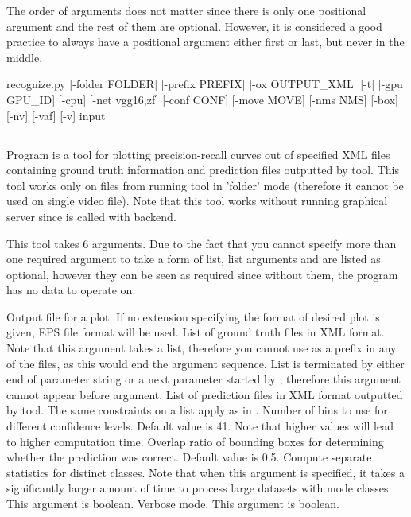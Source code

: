 The order of arguments does not matter since there is only one positional argument and the rest of them are optional. However, it is considered a good practice to always have a positional argument either first or last, but never in the middle.

\begin{usage}
recognize.py [-folder FOLDER] [-prefix PREFIX] [-ox OUTPUT_XML] [-t] [-gpu GPU_ID] [-cpu] [-net {vgg16,zf}] [-conf CONF] [-move MOVE] [-nms NMS] [-box] [-nv] [-vaf] [-v] input
\end{usage}

\subsection{} \label{pr}
Program  is a tool for plotting precision-recall curves out of specified XML files containing ground truth information and prediction files outputted by \hyperref[rec]{} tool. This tool works only on files from running  tool in 'folder' mode (therefore it cannot be used on single video file). Note that this tool works without running graphical server since  is called with  backend.

This tool takes 6 arguments. Due to the fact that you cannot specify more than one required argument to take a form of list, list arguments  and  are listed as optional, however they can be seen as required since without them, the program has no data to operate on.
\begin{description}
 Output file for a plot. If no extension specifying the format of desired plot is given, EPS file format will be used.
 List of ground truth files in XML format. Note that this argument takes a list, therefore you cannot use \pyarg{-} as a prefix in any of the files, as this would end the argument sequence. List is terminated by either end of parameter string or a next parameter started by \pyarg{-}, therefore this argument cannot appear before  argument.
 List of prediction files in XML format outputted by  tool. The same constraints on a list apply as in .
 Number of bins to use for different confidence levels. Default value is 41. Note that higher values will lead to higher computation time.
 Overlap ratio of bounding boxes for determining whether the prediction was correct. Default value is 0.5.
 Compute separate statistics for distinct classes. Note that when this argument is specified, it takes a significantly larger amount of time to process large datasets with mode classes. This argument is boolean.
 Verbose mode. This argument is boolean.
\end{description}

